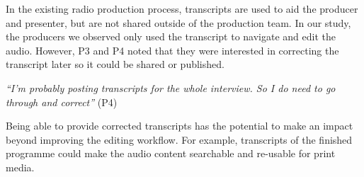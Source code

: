 In the existing radio production process, transcripts are used to aid the producer and presenter, but are
  not shared outside of the production team. In our study, the producers we observed only used the transcript
  to navigate and edit the audio. However, P3 and P4 noted that they were interested in correcting the transcript later
  so it could be shared or published.

\textit{``I'm probably posting transcripts for the whole interview. So I do
  need to go through and correct''} (P4)

Being able to provide corrected transcripts has the potential to make an impact beyond improving the
  editing workflow. For example, transcripts of the finished programme could make the audio content searchable and
  re-usable for print media.











